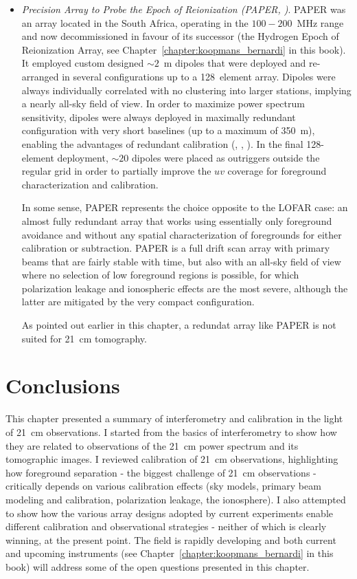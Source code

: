 {\begin{itemize}
\item {\it Precision Array to Probe the Epoch of Reionization (PAPER, \cite{parsons10})}. PAPER was an array located in the South Africa, operating in the $100-200$~MHz range and now decommissioned in favour of its successor (the Hydrogen Epoch of Reionization Array, see Chapter~\ref{chapter:koopmans_bernardi} in this book). It employed custom designed $\sim 2$~m dipoles that were deployed and re-arranged in several configurations up to a 128~element array. Dipoles were always individually correlated with no clustering into larger stations, implying a nearly all-sky field of view. In order to maximize power spectrum sensitivity, dipoles were always deployed in maximally redundant configuration with very short baselines (up to a maximum of 350~m), enabling the advantages of redundant calibration (\cite{parsons14}, \cite{ali15}, \cite{jacobs15}). In the final 128-element deployment, $\sim 20$ dipoles were placed as outriggers outside the regular grid in order to partially improve the $uv$ coverage for foreground characterization and calibration. 

In some sense, PAPER represents the choice opposite to the LOFAR case: an almost fully redundant array that works using essentially only foreground avoidance and without any spatial characterization of foregrounds for either calibration or subtraction. PAPER is a full drift scan array with primary beams that are fairly stable with time, but also with an all-sky field of view where no selection of low foreground regions is possible, for which polarization leakage and ionospheric effects are the most severe, although the latter are mitigated by the very compact configuration. 

As pointed out earlier in this chapter, a redundat array like PAPER is not suited for 21~cm tomography.
\end{itemize}


\section{Conclusions}
\label{sec:conclusions}

This chapter presented a summary of interferometry and calibration in the light of 21~cm observations. I started from the basics of interferometry to show how they are related to observations of the 21~cm power spectrum and its tomographic images. I reviewed calibration of 21~cm observations, highlighting how foreground separation - the biggest challenge of 21~cm observations - critically depends on various calibration effects (sky models, primary beam modeling and calibration, polarization leakage, the ionosphere). I also attempted to show how the various array designs adopted by current experiments enable different calibration and observational strategies - neither of which is clearly winning, at the present point. The field is rapidly developing and both current and upcoming instruments (see Chapter~\ref{chapter:koopmans_bernardi} in this book) will address some of the open questions presented in this chapter.



}
